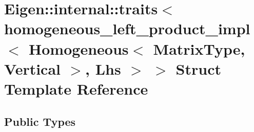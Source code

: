 \hypertarget{struct_eigen_1_1internal_1_1traits_3_01homogeneous__left__product__impl_3_01_homogeneous_3_01_ma5f6080eece96c58f7d2ccea57ec7242b}{}\section{Eigen\+::internal\+::traits$<$ homogeneous\+\_\+left\+\_\+product\+\_\+impl$<$ Homogeneous$<$ Matrix\+Type, Vertical $>$, Lhs $>$ $>$ Struct Template Reference}
\label{struct_eigen_1_1internal_1_1traits_3_01homogeneous__left__product__impl_3_01_homogeneous_3_01_ma5f6080eece96c58f7d2ccea57ec7242b}
\subsection*{Public Types}
